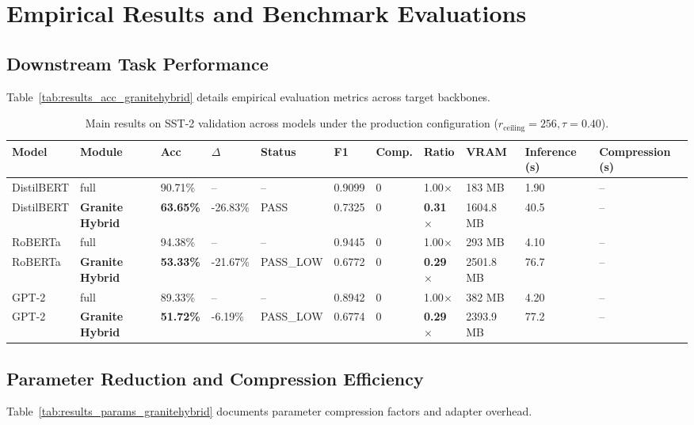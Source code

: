 \section{Empirical Results and Benchmark Evaluations}

\subsection{Downstream Task Performance}
Table~\ref{tab:results_acc_granitehybrid} details empirical evaluation metrics across target backbones.

\begin{table}[t]
\centering
\small
\begin{tabular}{lllllllllll}
\toprule
\textbf{Model} & \textbf{Module} & \textbf{Acc} & \textbf{$\Delta$} & \textbf{Status} & \textbf{F1} & \textbf{Comp.} & \textbf{Ratio} & \textbf{VRAM} & \textbf{Inference (s)} & \textbf{Compression (s)} \\
\midrule
DistilBERT & full & 90.71\% & -- & -- & 0.9099 & 0 & 1.00$\times$ & 183 MB & 1.90 & -- \\
DistilBERT & \textbf{Granite Hybrid} & \textbf{63.65\%} & -26.83\% & PASS & 0.7325 & 0 & \textbf{0.31$\times$} & 1604.8 MB & 40.5 & -- \\
RoBERTa & full & 94.38\% & -- & -- & 0.9445 & 0 & 1.00$\times$ & 293 MB & 4.10 & -- \\
RoBERTa & \textbf{Granite Hybrid} & \textbf{53.33\%} & -21.67\% & PASS\_LOW & 0.6772 & 0 & \textbf{0.29$\times$} & 2501.8 MB & 76.7 & -- \\
GPT-2 & full & 89.33\% & -- & -- & 0.8942 & 0 & 1.00$\times$ & 382 MB & 4.20 & -- \\
GPT-2 & \textbf{Granite Hybrid} & \textbf{51.72\%} & -6.19\% & PASS\_LOW & 0.6774 & 0 & \textbf{0.29$\times$} & 2393.9 MB & 77.2 & -- \\
\bottomrule
\end{tabular}
\caption{Main results on SST-2 validation across models under the production configuration ($r_{\mathrm{ceiling}}=256, \tau=0.40$).}
\label{tab:main_sst2}
\end{table}

\subsection{Parameter Reduction and Compression Efficiency}
Table~\ref{tab:results_params_granitehybrid} documents parameter compression factors and adapter overhead.

